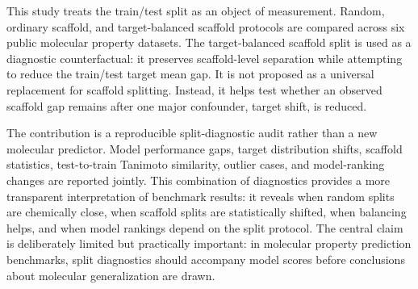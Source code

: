 This study treats the train/test split as an object of measurement. Random, ordinary scaffold, and target-balanced scaffold protocols are compared across six public molecular property datasets. The target-balanced scaffold split is used as a diagnostic counterfactual: it preserves scaffold-level separation while attempting to reduce the train/test target mean gap. It is not proposed as a universal replacement for scaffold splitting. Instead, it helps test whether an observed scaffold gap remains after one major confounder, target shift, is reduced.

The contribution is a reproducible split-diagnostic audit rather than a new molecular predictor. Model performance gaps, target distribution shifts, scaffold statistics, test-to-train Tanimoto similarity, outlier cases, and model-ranking changes are reported jointly. This combination of diagnostics provides a more transparent interpretation of benchmark results: it reveals when random splits are chemically close, when scaffold splits are statistically shifted, when balancing helps, and when model rankings depend on the split protocol. The central claim is deliberately limited but practically important: in molecular property prediction benchmarks, split diagnostics should accompany model scores before conclusions about molecular generalization are drawn.

